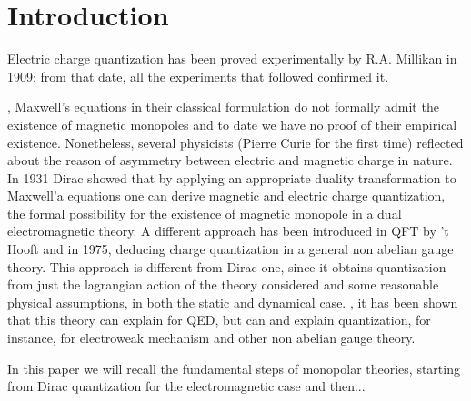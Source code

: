 \documentclass[main.tex]{subfiles}
\begin{document}
\section{Introduction}

Electric charge quantization has been proved experimentally by R.A. Millikan in 1909: from that date, all the experiments that followed confirmed it.


, Maxwell's equations in their classical formulation do not formally admit the existence of magnetic monopoles and to date we have no proof of their empirical existence.
Nonetheless, several physicists (Pierre Curie for the first time) reflected about the reason of asymmetry between electric and magnetic charge in nature.
In 1931 Dirac showed that by applying an appropriate duality transformation to Maxwell'a equations one can derive  magnetic and electric charge quantization,  the formal possibility for the existence of magnetic monopole in a dual electromagnetic theory.
A different approach has been introduced in QFT by 't Hooft and  in 1975, deducing charge quantization in a general non abelian gauge theory.
This approach is different from Dirac one, since it obtains quantization from just the lagrangian action of the theory considered and some reasonable physical assumptions, in both the static and dynamical case.
, it has been shown that this theory can explain  for QED, but can  and explain quantization, for instance, for electroweak mechanism and other non abelian gauge theory.

In this paper we will recall the fundamental steps of monopolar theories, starting from Dirac quantization for the electromagnetic case and then...
\end{document}
